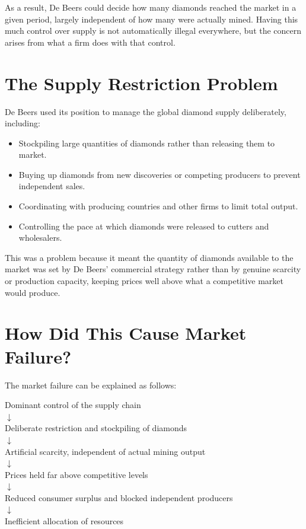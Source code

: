 As a result, De Beers could decide how many diamonds reached the market in a given period, largely independent of how many were actually mined. Having this much control over supply is not automatically illegal everywhere, but the concern arises from what a firm does with that control.

\section{The Supply Restriction Problem}
De Beers used its position to manage the global diamond supply deliberately, including:
\begin{itemize}
  \item Stockpiling large quantities of diamonds rather than releasing them to market.
  \item Buying up diamonds from new discoveries or competing producers to prevent independent sales.
  \item Coordinating with producing countries and other firms to limit total output.
  \item Controlling the pace at which diamonds were released to cutters and wholesalers.
\end{itemize}

This was a problem because it meant the quantity of diamonds available to the market was set by De Beers' commercial strategy rather than by genuine scarcity or production capacity, keeping prices well above what a competitive market would produce.

\section{How Did This Cause Market Failure?}
The market failure can be explained as follows:

\begin{center}
Dominant control of the supply chain\\
$\downarrow$\\
Deliberate restriction and stockpiling of diamonds\\
$\downarrow$\\
Artificial scarcity, independent of actual mining output\\
$\downarrow$\\
Prices held far above competitive levels\\
$\downarrow$\\
Reduced consumer surplus and blocked independent producers\\
$\downarrow$\\
Inefficient allocation of resources
\end{center}

